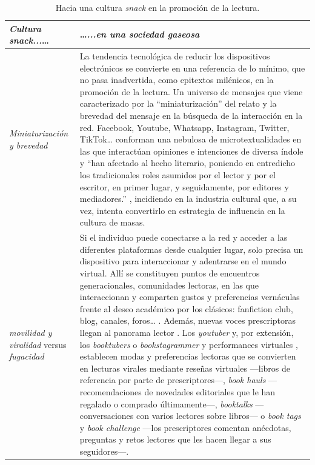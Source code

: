 \documentclass[spanish]{textolivre}
\begin{document}
\begin{small}
\renewcommand{\arraystretch}{1.5}
\begin{longtable}{
    >{\raggedright\arraybackslash}p{}
    p{}
    }
\caption{Hacia una cultura \emph{snack} en la promoción de la lectura.}
\label{tbl01}
\\
\toprule
\emph{Cultura snack...}\ldots  & \ldots \emph{...en una sociedad gaseosa}\\
\midrule
\emph{Miniaturización y brevedad} & 
La tendencia tecnológica de reducir los dispositivos electrónicos se convierte en una referencia de lo mínimo, que no pasa inadvertida, como epitextos milénicos, en la promoción de la lectura. Un universo de mensajes que viene caracterizado por la “miniaturización” del relato y la brevedad del mensaje en la búsqueda de la interacción en la red. Facebook, Youtube, Whatsapp, Instagram, Twitter, TikTok… conforman una nebulosa de microtextualidades \cite{rodenas2009microtextualidad} en las que interactúan opiniones e intenciones de diversa índole y “han afectado al hecho literario, poniendo en entredicho los tradicionales roles asumidos por el lector y por el escritor, en primer lugar, y seguidamente, por editores y mediadores.” \cite[p.71]{ramos_epitextos_2018}, incidiendo en la industria cultural que, a su vez, intenta convertirlo en estrategia de influencia en la cultura de masas. \\

\emph{movilidad y viralidad} versus \emph{fugacidad} &
Si el individuo puede conectarse a la red y acceder a las diferentes plataformas desde cualquier lugar, solo precisa un dispositivo para interaccionar y adentrarse en el mundo virtual. Allí se constituyen puntos de encuentros generacionales, comunidades lectoras, en las que interaccionan y comparten gustos y preferencias vernáculas frente al deseo académico por los clásicos: fanfiction club, blog, canales, foros… \cite{martos_nunez_tunear_2006}. 
Además, nuevas voces prescriptoras llegan al panorama lector \cite{parratt-fernandez_nuevos_2021}. Los \emph{ youtuber} y, por extensión, los \emph{booktubers} o \emph{bookstagrammer} y performances virtuales \cite{cruces_como_2017}, establecen modas y preferencias lectoras que se convierten en lecturas virales mediante reseñas virtuales —libros de referencia por parte de prescriptores—, \emph{book hauls} —recomendaciones de novedades editoriales que le han regalado o comprado últimamente—, \emph{booktalks} —conversaciones con varios lectores sobre libros— o \emph{book tags} y \emph{book challenge} —los prescriptores comentan anécdotas, preguntas y retos lectores que les hacen llegar a sus seguidores—. 


\end{longtable}
\end{small}
\end{document}
